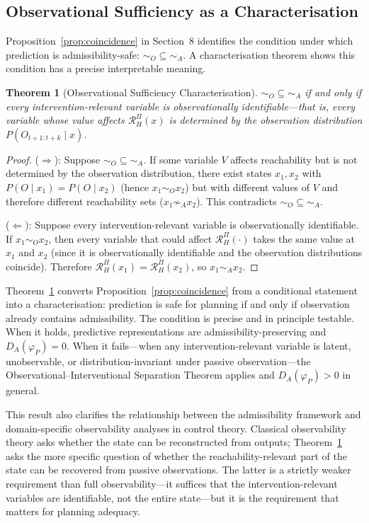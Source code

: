 \documentclass[11pt, a4paper]{article}
\theoremstyle{plain}
\newtheorem{theorem}{Theorem}
\theoremstyle{definition}
\theoremstyle{remark}
\newcommand{\simA}{\sim_A}
\newcommand{\simO}{\sim_O}
\newcommand{\RHP}{\mathcal{R}_H^\Pi}
\begin{document}
\subsection{Observational Sufficiency as a Characterisation}

Proposition~\ref{prop:coincidence} in Section~8 identifies the condition under
which prediction is admissibility-safe: ${\simO} \subseteq {\simA}$. A
characterisation theorem shows this condition has a precise interpretable meaning.

\begin{theorem}[Observational Sufficiency Characterisation]
\label{thm:obs_suff}
${\simO} \subseteq {\simA}$ if and only if every intervention-relevant variable
is observationally identifiable---that is, every variable whose value affects
$\RHP(x)$ is determined by the observation distribution $P(O_{t+1:t+k} \mid x)$.
\end{theorem}

\begin{proof}
($\Rightarrow$): Suppose ${\simO} \subseteq {\simA}$. If some variable $V$
affects reachability but is not determined by the observation distribution,
there exist states $x_1, x_2$ with $P(O \mid x_1) = P(O \mid x_2)$ (hence
$x_1 \simO x_2$) but with different values of $V$ and therefore different
reachability sets ($x_1 \not\simA x_2$). This contradicts ${\simO} \subseteq
{\simA}$.

($\Leftarrow$): Suppose every intervention-relevant variable is observationally
identifiable. If $x_1 \simO x_2$, then every variable that could affect
$\RHP(\cdot)$ takes the same value at $x_1$ and $x_2$ (since it is
observationally identifiable and the observation distributions coincide).
Therefore $\RHP(x_1) = \RHP(x_2)$, so $x_1 \simA x_2$.
\end{proof}

Theorem~\ref{thm:obs_suff} converts Proposition~\ref{prop:coincidence} from a
conditional statement into a characterisation: prediction is safe for planning
if and only if observation already contains admissibility. The condition is
precise and in principle testable. When it holds, predictive representations
are admissibility-preserving and $D_A(\varphi_P) = 0$. When it fails---when
any intervention-relevant variable is latent, unobservable, or
distribution-invariant under passive observation---the Observational--Interventional
Separation Theorem applies and $D_A(\varphi_P) > 0$ in general.

This result also clarifies the relationship between the admissibility framework
and domain-specific observability analyses in control theory. Classical
observability theory \citep{kalman1960general} asks whether the state can be
reconstructed from outputs; Theorem~\ref{thm:obs_suff} asks the more specific
question of whether the reachability-relevant part of the state can be recovered
from passive observations. The latter is a strictly weaker requirement than full
observability---it suffices that the intervention-relevant variables are
identifiable, not the entire state---but it is the requirement that matters for
planning adequacy.
\end{document}
